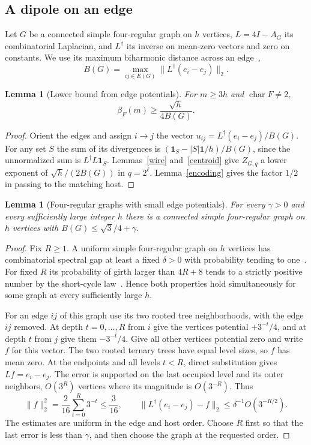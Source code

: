 \documentclass[11pt]{article}
\newtheorem{lemma}[theorem]{Lemma}
\theoremstyle{remark}
\begin{document}
\subsection{A dipole on an edge}
Let $G$ be a connected simple four-regular graph on $h$ vertices, $L=4I-A_G$ its combinatorial Laplacian, and $L^\dagger$ its inverse on mean-zero vectors and zero on constants. We use its maximum biharmonic distance across an edge~\cite{biharmonic},
\[
 B(G)=\max_{ij\in E(G)}\|L^\dagger(e_i-e_j)\|_2 .
\]
\begin{lemma}[Lower bound from edge potentials]\label{matchingtransfer}
For $m\ge3h$ and $\operatorname{char} F\ne2$,
\[
                    \beta_F(m)\ge \frac{\sqrt h}{4 B(G)} .
\]
\end{lemma}
\begin{proof}
Orient the edges and assign $i\to j$ the vector $u_{ij}=L^\dagger(e_i-e_j)/B(G)$. For any set $S$ the sum of its divergences is $(\mathbf1_S-|S|\mathbf1/h)/B(G)$, since the unnormalized sum is $L^\dagger L\mathbf1_S$. Lemmas~\ref{wire} and~\ref{centroid} give $Z_{G,q}$ a lower exponent of $\sqrt h/(2B(G))$ in $q=2^\ell$. Lemma~\ref{encoding} gives the factor $1/2$ in passing to the matching host.
\end{proof}

\begin{lemma}[Four-regular graphs with small edge potentials]\label{dipole}
For every $\gamma>0$ and every sufficiently large integer $h$ there is a connected simple four-regular graph on $h$ vertices with $B(G)\le\sqrt3/4+\gamma$.
\end{lemma}
\begin{proof}
Fix $R\ge1$. A uniform simple four-regular graph on $h$ vertices has combinatorial spectral gap at least a fixed $\delta>0$ with probability tending to one~\cite{friedman}. For fixed $R$ its probability of girth larger than $4R+8$ tends to a strictly positive number by the short-cycle law~\cite{cycles}. Hence both properties hold simultaneously for some graph at every sufficiently large $h$.

For an edge $ij$ of this graph use its two rooted tree neighborhoods, with the edge $ij$ removed. At depth $t=0,\dots,R$ from $i$ give the vertices potential $+3^{-t}/4$, and at depth $t$ from $j$ give them $-3^{-t}/4$. Give all other vertices potential zero and write $f$ for this vector. The two rooted ternary trees have equal level sizes, so $f$ has mean zero. At the endpoints and all levels $t<R$, direct substitution gives $Lf=e_i-e_j$. The error is supported on the last occupied level and its outer neighbors, $O(3^R)$ vertices where its magnitude is $O(3^{-R})$. Thus
\[
 \|f\|_2^2=\frac{2}{16}\sum_{t=0}^R3^{-t}\le\frac3{16},\qquad
 \|L^\dagger(e_i-e_j)-f\|_2\le\delta^{-1}O(3^{-R/2}).
\]
The estimates are uniform in the edge and host order. Choose $R$ first so that the last error is less than $\gamma$, and then choose the graph at the requested order.
\end{proof}
\end{document}
